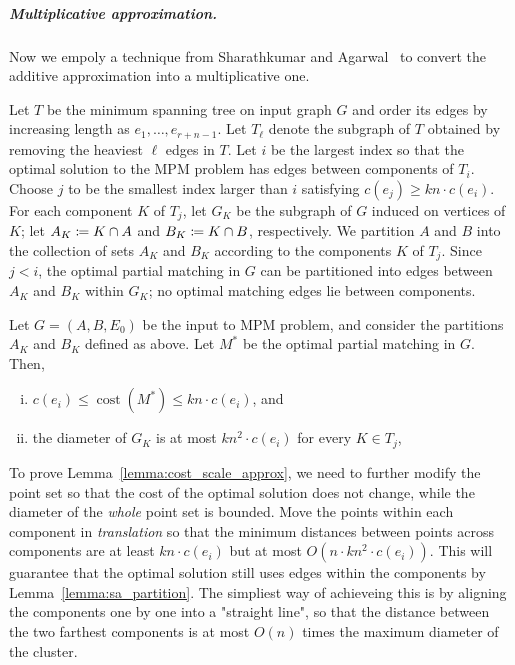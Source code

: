 \documentclass[a4paper,UKenglish]{socg-lipics-v2018}
\makeatletter
\def\note#1{\textcolor{red}{{#1}}}
\def\polylog{\mathop{\mathrm{polylog}}}
\def\cost{\operatorname{cost}}
\theoremstyle{plain}
\numberwithin{figure}{section}
\renewcommand{\paragraph}{\subparagraph}
\def\EMPH#1{\textbf{\emph{\boldmath #1}}}
\def\n@te#1{\textsf{\boldmath \textbf{$\langle\!\langle$#1$\rangle\!\rangle$}}\leavevmode}
\def\note#1{\textcolor{red}{\n@te{#1}}}
\makeatother
\begin{document}
\paragraph{Multiplicative approximation.}
Now we empoly a technique from Sharathkumar and Agarwal~\cite{SA12} to convert the additive approximation into a multiplicative one.

Let $T$ be the minimum spanning tree on input graph $G$ and order
its edges by increasing length as $e_1, \ldots, e_{r+n-1}$.
Let $T_\ell$ denote the subgraph of $T$ obtained by removing the heaviest $\ell$ edges in $T$.
%
Let $i$ be the largest index so that
the optimal solution to the MPM problem has edges between components of $T_i$.
Choose $j$ to be the smallest index larger than $i$ satisfying
$c(e_j) \geq kn \cdot c(e_i)$.
For each component $K$ of $T_j$, let
$G_K$ be the subgraph of $G$ induced on vertices of $K$;
let $\EMPH{$A_K$} \coloneqq K \cap A$ and $\EMPH{$B_K$} \coloneqq K \cap B$, respectively.
We partition $A$ and $B$ into the collection of sets $A_K$ and $B_K$ according to the components $K$ of $T_j$.
Since $j < i$, the optimal partial matching in $G$ can be partitioned into edges between $A_K$ and $B_K$ within $G_K$; no optimal matching edges lie between components.

\begin{lemma}
\label{lemma:sa_partition}
%
Let $G = (A,B,E_0)$ be the input to MPM problem, and consider the partitions $A_K$ and $B_K$ defined as above.
Let $M^*$ be the optimal partial matching in $G$.
Then,
\begin{enumerate}[(i)]
\item $c(e_i) \leq \cost(M^*) \le kn \cdot c(e_i)$, and
\item the diameter of $G_K$ is at most $kn^2 \cdot c(e_i)$ for every $K \in T_j$,
\end{enumerate}
\end{lemma}

To prove Lemma~\ref{lemma:cost_scale_approx}, we need to further modify the point set so that the cost of the optimal solution does not change, while the diameter of the \emph{whole} point set is bounded.
%
Move the points within each component in \emph{translation} so that the minimum distances between points across components are at least $kn \cdot c(e_i)$ but at most $O(n \cdot kn^2 \cdot c(e_i))$.  This will guarantee that the optimal solution still uses edges within the components by Lemma~\ref{lemma:sa_partition}.  The simpliest way of achieveing this is by aligning the components one by one into a "straight line", so that the distance between the two farthest components is at most $O(n)$ times the maximum diameter of the cluster.
\end{document}

